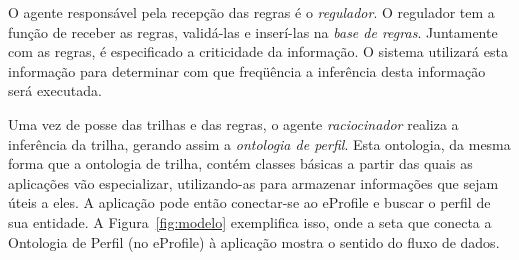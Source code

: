 O agente responsável pela recepção das regras é o \emph{regulador}. O regulador tem a função de receber as regras, validá-las e inserí-las na \emph{base de regras}. Juntamente com as regras, é especificado a criticidade da informação. O sistema utilizará esta informação para determinar com que freqüência a inferência desta informação será executada.

Uma vez de posse das trilhas e das regras, o agente \emph{raciocinador} realiza a inferência da trilha, gerando assim a \emph{ontologia de perfil}. Esta ontologia, da mesma forma que a ontologia de trilha, contém classes básicas a partir das quais as aplicações vão especializar, utilizando-as para armazenar informações que sejam úteis a eles. A aplicação pode então conectar-se ao eProfile e buscar o perfil de sua entidade. A Figura~\ref{fig:modelo} exemplifica isso, onde a seta que conecta a Ontologia de Perfil (no eProfile) à aplicação mostra o sentido do fluxo de dados.
